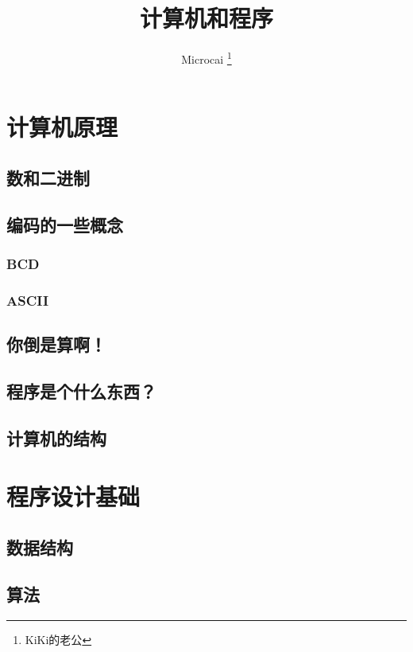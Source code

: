 \documentclass[cm-default,no-math,SlantFont,CJKnumber,a4papper,oneside]{ctexbook}
\title{计算机和程序}
\author{\sc Microcai \thanks{KiKi的老公}}
\begin{document}
\maketitle

\tableofcontents

\part{计算机原理}

\chapter{数和二进制}

\chapter{编码的一些概念}
\section{BCD}
\section{ASCII}

\chapter{你倒是算啊！}

\chapter{程序是个什么东西？}

\chapter{计算机的结构}



\part{程序设计基础}

\chapter{数据结构}
\chapter{算法}
\end{document}
